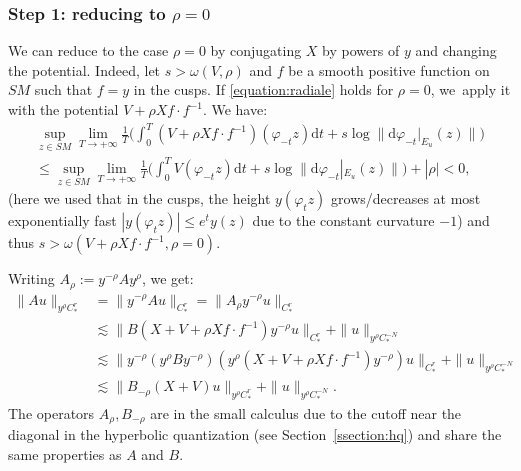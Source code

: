 \documentclass[10pt]{amsart}
\newcommand{\dd}{\mathrm{d}}
\theoremstyle{plain}
\theoremstyle{definition}
\begin{document}
\subsubsection*{Step 1: reducing to $\rho=0$} We can reduce to the case $\rho = 0$ by conjugating $X$ by powers of $y$ and changing the potential. Indeed, let $s > \omega(V,\rho)$ and $f$ be a smooth positive function on $SM$ such that $f = y$ in the cusps. If \eqref{equation:radiale} holds for $\rho=0$, we~apply it with the potential $V + \rho Xf \cdot f^{-1}$. We have:
\begin{multline*}
\sup_{z \in SM} \lim_{T \to +\infty} \frac{1}{T} \biggl(\int_0^T (V+ \rho Xf \cdot f^{-1})(\varphi_{-t} z) \dd t + s \log \|\dd \varphi_{-t}|_{E_u}(z)\| \biggr) \\
\leq \sup_{z \in SM} \lim_{T \to +\infty} \frac{1}{T}\biggl(\int_0^T V(\varphi_{-t} z) \dd t + s \log \|\dd \varphi_{-t}|_{E_u}(z)\| \biggr) +|\rho| < 0,
\end{multline*}
(here we used that in the cusps, the height $y(\varphi_tz)$ grows/decreases at most exponentially fast \ie $|y(\varphi_t z)| \leq e^t y(z)$ due to the constant curvature $-1$) and thus $s > \omega(V+ \rho Xf \cdot f^{-1},\rho=0)$.

Writing $A_\rho := y^{-\rho}Ay^\rho$, we get:
\[
\begin{split}
\|Au \|_{y^\rho C^r_*} & = \|y^{-\rho}Au\|_{C^r_*} = \|A_\rho y^{-\rho} u\|_{C^r_*} \\
& \lesssim \|B (X+V+ \rho Xf \cdot f^{-1}) y^{-\rho} u\|_{C^r_*} + \|u\|_{y^\rho C^{-N}_*} \\
& \lesssim \|y^{-\rho} (y^\rho B y^{-\rho}) \left(y^{\rho} (X+V+\rho Xf \cdot f^{-1}) y^{-\rho}\right) u\|_{C^r_*} + \|u\|_{y^\rho C^{-N}_*} \\
& \lesssim \|B_{-\rho} (X + V) u\|_{y^\rho C^r_*} + \|u\|_{y^\rho C^{-N}_*}.
\end{split}
\]
The operators $A_\rho,B_{-\rho}$ are in the small calculus due to the cutoff near the diagonal in the hyperbolic quantization (see Section~\ref{ssection:hq}) and share the same properties as $A$ and $B$.
\end{document}
